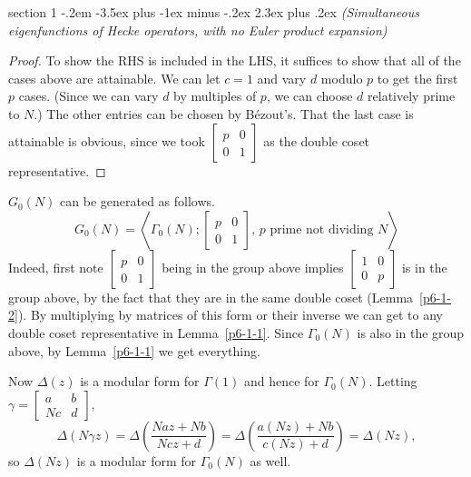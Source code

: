 \documentclass[12pt]{article}
\makeatletter
\theoremstyle{norm}
\newcommand{\Q}[0]{\mathbb{Q}}
\newcommand{\ga}[0]{\gamma}
\newcommand{\Ga}[0]{\Gamma}
\newcommand{\De}[0]{\Delta}
\newcommand{\pa}[1]{\left( {#1} \right)}
\newcommand{\an}[1]{\left\langle {#1}\right\rangle}
\newcommand{\pf}[2]{\pa{\frac{#1}{#2}}}
\newcommand{\matt}[4]{
\left[
\begin{matrix}
{#1}&{#2}\\
{#3}&{#4}
\end{matrix}
\right]}
\newcommand{\smatt}[4]{
\left[
\begin{smallmatrix}
{#1}&{#2}\\
{#3}&{#4}
\end{smallmatrix}
\right]}
\newenvironment{problem}{\@startsection
       {section}
       {1}
       {-.2em}
       {-3.5ex plus -1ex minus -.2ex}
       {2.3ex plus .2ex}
       {\pagebreak[3]%
       \large\bf\noindent{Problem }
       }
       }
       {%
       }
\makeatother
\begin{document}
\begin{problem}{\it (Simultaneous eigenfunctions of Hecke operators, with no Euler product expansion)}
\begin{proof}
To show the RHS is included in the LHS, it suffices to show that all of the cases above are attainable. We can let $c=1$ and vary $d$ modulo $p$ to get the first $p$ cases. (Since we can vary $d$ by multiples of $p$, we can choose $d$ relatively 
prime to $N$.) The other entries can be chosen by B\'ezout's. That the last case is attainable is obvious, since we took $\smatt p001$ as the double coset representative. %
\end{proof}
$G_0(N)$ can be generated as follows.
\begin{equation}\label{geng0}
G_0(N)=\an{
\Ga_0(N);\matt p001,\,p\text{ prime not dividing }N
}
\end{equation}
Indeed, first note $\smatt p001$ being in the group above implies $\matt 100p$ is in the group above, by the fact that they are in the same double coset (Lemma~\ref{p6-1-2}). By multiplying by matrices of this form or their inverse we can get to any double coset representative in Lemma~\ref{p6-1-1}.
Since $\Ga_0(N)$ is also in the group above, by Lemma~\ref{p6-1-1} we get everything.

Now $\De(z)$ is a modular form for $\Ga(1)$ and hence for $\Ga_0(N)$. Letting $\ga=\smatt ab{Nc}d$,
\[
\De(N\ga z)=\De\pf{Naz+Nb}{Ncz+d}=\De\pf{a(Nz)+Nb}{c(Nz)+d}=\De(Nz),
\]
so $\De(Nz)$ is a modular form for $\Ga_0(N)$ as well.


\end{problem}
\end{document}
